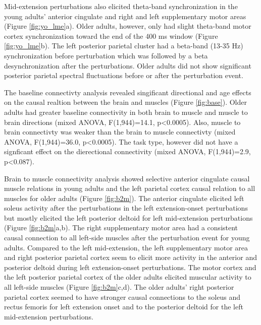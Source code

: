 \documentclass[../thesis_seyed.tex]{subfiles}
\begin{document}
Mid-extension perturbations also elicited theta-band synchronization in the young adults’ anterior cingulate and right and left supplementary motor areas (Figure \ref{fig:yo_lme}a). Older adults, however, only had slight theta-band motor cortex synchronization toward the end of the 400 ms window (Figure \ref{fig:yo_lme}b). The left posterior parietal cluster had a beta-band (13-35 Hz) synchronization before perturbation which was followed by a beta desynchronization after the perturbations. Older adults did not show significant posterior parietal spectral fluctuations before or after the perturbation event.

The baseline connectivty analysis revealed singificant directional and age effects on the causal realtion between the brain and muscles (Figure \ref{fig:base}). Older adults had greater baseline connectivity in both brain to muscle and muscle to brain directions (mixed ANOVA, F\tsu(1,944)=14.1, p<0.0005). Also, muscle to brain connectivty was weaker than the brain to muscle connectivty (mixed ANOVA, F\tsu(1,944)=36.0, p<0.0005). The task type, however did not have a signficant effect on the dierectional connectivity (mixed ANOVA, F\tsu(1,944)=2.9, p<0.087).

Brain to muscle connectivity analysis showed selective anterior cingulate causal muscle relations in young adults and the left parietal cortex causal relation to all muscles for older adults (Figure \ref{fig:b2m}).  The anterior cingulate elicited left soleus activity after the perturbations in the left extension-onset perturbations but mostly elicited the left posterior deltoid for left mid-extension perturbations (Figure \ref{fig:b2m}a,b). The right supplementary motor area had a consistent causal connection to all left-side muscles after the perturbation event for young adults. Compared to the left mid-extension, the left supplementary motor area and right posterior parietal cortex seem to elicit more activity in the anterior and posterior deltoid during left extension-onset perturbations.  The motor cortex and the left posterior parietal cortex of the older adults elicited muscular activity to all left-side muscles (Figure \ref{fig:b2m}c,d). The older adults’ right posterior parietal cortex seemed to have stronger causal connections to the soleus and rectus femoris for left extension onset and to the posterior deltoid for the left mid-extension perturbations.
\end{document}
